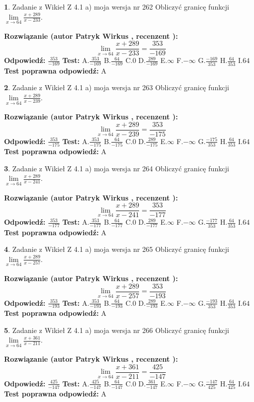 \documentclass[12pt, a4paper]{article}
\theoremstyle{definition} %
\newtheorem{zad}{}
\newcommand{\zadStart}[1]{\begin{zad}#1\newline}
\newcommand{\zadStop}{\end{zad}}
\newcommand{\rozwStart}[2]{\noindent \textbf{Rozwiązanie (autor #1 , recenzent #2): }\newline}
\newcommand{\rozwStop}{\newline}
\newcommand{\odpStart}{\noindent \textbf{Odpowiedź:}\newline}
\newcommand{\odpStop}{\newline}
\newcommand{\testStart}{\noindent \textbf{Test:}\newline}
\newcommand{\testStop}{\newline}
\newcommand{\kluczStart}{\noindent \textbf{Test poprawna odpowiedź:}\newline}
\newcommand{\kluczStop}{\newline}
\begin{document}
\zadStart{Zadanie z Wikieł Z 4.1 a) moja wersja nr 262}
Obliczyć granicę funkcji $\lim\limits_{x\to64}\frac{x+289}{x-233}$.
\zadStop
\rozwStart{Patryk Wirkus}{}
$$\lim\limits_{x\to64}\frac{x+289}{x-233} = \frac{353}{-169}$$
\rozwStop
\odpStart
$\frac{353}{-169}$
\odpStop
\testStart
A.$\frac{353}{-169}$
B.$\frac{64}{-169}$
C.$0$
D.$\frac{289}{-169}$
E.$\infty$
F.$-\infty$
G.$\frac{-169}{353}$
H.$\frac{64}{353}$
I.$64$
\testStop
\kluczStart
A
\kluczStop



\zadStart{Zadanie z Wikieł Z 4.1 a) moja wersja nr 263}
Obliczyć granicę funkcji $\lim\limits_{x\to64}\frac{x+289}{x-239}$.
\zadStop
\rozwStart{Patryk Wirkus}{}
$$\lim\limits_{x\to64}\frac{x+289}{x-239} = \frac{353}{-175}$$
\rozwStop
\odpStart
$\frac{353}{-175}$
\odpStop
\testStart
A.$\frac{353}{-175}$
B.$\frac{64}{-175}$
C.$0$
D.$\frac{289}{-175}$
E.$\infty$
F.$-\infty$
G.$\frac{-175}{353}$
H.$\frac{64}{353}$
I.$64$
\testStop
\kluczStart
A
\kluczStop



\zadStart{Zadanie z Wikieł Z 4.1 a) moja wersja nr 264}
Obliczyć granicę funkcji $\lim\limits_{x\to64}\frac{x+289}{x-241}$.
\zadStop
\rozwStart{Patryk Wirkus}{}
$$\lim\limits_{x\to64}\frac{x+289}{x-241} = \frac{353}{-177}$$
\rozwStop
\odpStart
$\frac{353}{-177}$
\odpStop
\testStart
A.$\frac{353}{-177}$
B.$\frac{64}{-177}$
C.$0$
D.$\frac{289}{-177}$
E.$\infty$
F.$-\infty$
G.$\frac{-177}{353}$
H.$\frac{64}{353}$
I.$64$
\testStop
\kluczStart
A
\kluczStop



\zadStart{Zadanie z Wikieł Z 4.1 a) moja wersja nr 265}
Obliczyć granicę funkcji $\lim\limits_{x\to64}\frac{x+289}{x-257}$.
\zadStop
\rozwStart{Patryk Wirkus}{}
$$\lim\limits_{x\to64}\frac{x+289}{x-257} = \frac{353}{-193}$$
\rozwStop
\odpStart
$\frac{353}{-193}$
\odpStop
\testStart
A.$\frac{353}{-193}$
B.$\frac{64}{-193}$
C.$0$
D.$\frac{289}{-193}$
E.$\infty$
F.$-\infty$
G.$\frac{-193}{353}$
H.$\frac{64}{353}$
I.$64$
\testStop
\kluczStart
A
\kluczStop



\zadStart{Zadanie z Wikieł Z 4.1 a) moja wersja nr 266}
Obliczyć granicę funkcji $\lim\limits_{x\to64}\frac{x+361}{x-211}$.
\zadStop
\rozwStart{Patryk Wirkus}{}
$$\lim\limits_{x\to64}\frac{x+361}{x-211} = \frac{425}{-147}$$
\rozwStop
\odpStart
$\frac{425}{-147}$
\odpStop
\testStart
A.$\frac{425}{-147}$
B.$\frac{64}{-147}$
C.$0$
D.$\frac{361}{-147}$
E.$\infty$
F.$-\infty$
G.$\frac{-147}{425}$
H.$\frac{64}{425}$
I.$64$
\testStop
\kluczStart
A
\kluczStop
\end{document}
